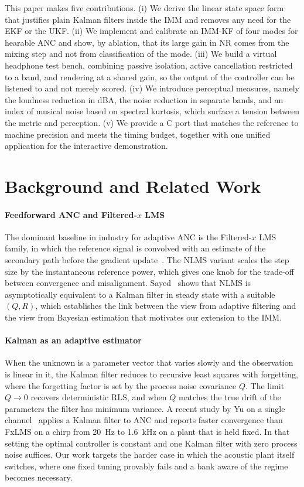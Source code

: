 \documentclass[conference]{IEEEtran}
\begin{document}
This paper makes five contributions. (i) We derive the linear state space form that
justifies plain Kalman filters inside the IMM and removes any need for the EKF or
the UKF. (ii) We implement and calibrate an IMM-KF of four modes for hearable ANC
and show, by ablation, that its large gain in NR comes from the mixing step and not
from classification of the mode. (iii) We build a virtual headphone test bench,
combining passive isolation, active cancellation restricted to a band, and
rendering at a shared gain, so the output of the controller can be listened to and
not merely scored. (iv) We introduce perceptual measures, namely the loudness
reduction in dBA, the noise reduction in separate bands, and an index of musical
noise based on spectral kurtosis, which surface a tension between the metric and
perception. (v) We provide a C port that matches the reference to machine precision
and meets the timing budget, together with one unified application for the
interactive demonstration.

\section{Background and Related Work}

\paragraph{Feedforward ANC and Filtered-$x$ LMS} The dominant baseline in industry
for adaptive ANC is the Filtered-$x$ LMS family, in which the reference signal is
convolved with an estimate of the secondary path before the gradient
update~\cite{Kuo:ANC1996}. The NLMS variant scales the step size by the
instantaneous reference power, which gives one knob for the trade-off between
convergence and misalignment. Sayed~\cite{Sayed:adaptive2003} shows that NLMS is
asymptotically equivalent to a Kalman filter in steady state with a suitable
$(Q,R)$, which establishes the link between the view from adaptive filtering and the
view from Bayesian estimation that motivates our extension to the IMM.

\paragraph{Kalman as an adaptive estimator} When the unknown is a parameter vector
that varies slowly and the observation is linear in it, the Kalman filter reduces to
recursive least squares with forgetting, where the forgetting factor is set by the
process noise covariance $Q$. The limit $Q\to 0$ recovers deterministic RLS, and
when $Q$ matches the true drift of the parameters the filter has minimum variance.
A recent study by Yu on a single channel~\cite{Yu:kfanc24} applies a Kalman filter
to ANC and reports faster convergence than FxLMS on a chirp from \SI{20}{\hertz} to
\SI{1.6}{\kilo\hertz} on a plant that is held fixed. In that setting the optimal
controller is constant and one Kalman filter with zero process noise suffices. Our
work targets the harder case in which the acoustic plant itself switches, where one
fixed tuning provably fails and a bank aware of the regime becomes necessary.
\end{document}

